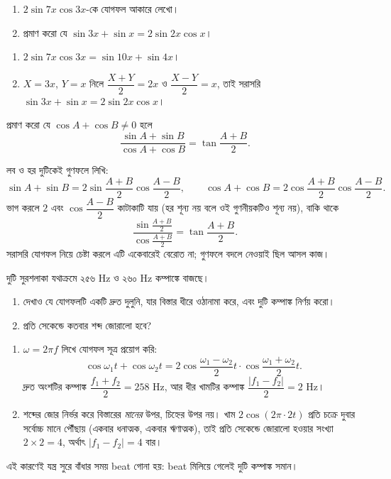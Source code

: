 \documentclass[11pt]{article}
\begin{document}
 \begin{enumerate}
  \item $2\sin 7x\cos 3x$-কে যোগফল আকারে লেখো।
  \item প্রমাণ করো যে $\sin 3x + \sin x = 2\sin 2x\cos x$।
\end{enumerate}

\begin{sol}
\begin{enumerate}
  \item $2\sin 7x\cos 3x = \sin 10x + \sin 4x$।
  \item $X = 3x$, $Y = x$ নিলে $\dfrac{X+Y}{2} = 2x$ ও $\dfrac{X-Y}{2} = x$,
        তাই সরাসরি $\sin 3x + \sin x = 2\sin 2x\cos x$।
\end{enumerate}
\end{sol}

 প্রমাণ করো যে $\cos A + \cos B \neq 0$ হলে
\[
  \frac{\sin A + \sin B}{\cos A + \cos B} = \tan\frac{A+B}{2} .
\]

\begin{sol}
লব ও হর দুটিকেই গুণফলে লিখি:
\[
  \sin A + \sin B = 2\sin\frac{A+B}{2}\cos\frac{A-B}{2}, \qquad
  \cos A + \cos B = 2\cos\frac{A+B}{2}\cos\frac{A-B}{2} .
\]
ভাগ করলে $2$ এবং $\cos\dfrac{A-B}{2}$ কাটাকাটি যায় (হর শূন্য নয় বলে ওই
গুণনীয়কটিও শূন্য নয়), বাকি থাকে
\[
  \frac{\sin\frac{A+B}{2}}{\cos\frac{A+B}{2}} = \tan\frac{A+B}{2} .
\]
সরাসরি যোগফল নিয়ে চেষ্টা করলে এটি একেবারেই বেরোত না; গুণফলে বদলে নেওয়াই ছিল
আসল কাজ।
\end{sol}

 দুটি সুরশলাকা যথাক্রমে ২৫৬ Hz ও ২৬০ Hz কম্পাঙ্কে বাজছে।
\begin{enumerate}
  \item দেখাও যে যোগফলটি একটি দ্রুত দুলুনি, যার বিস্তার ধীরে ওঠানামা করে, এবং
        দুটি কম্পাঙ্ক নির্ণয় করো।
  \item প্রতি সেকেন্ডে কতবার শব্দ জোরালো হবে?
\end{enumerate}

\begin{sol}
\begin{enumerate}
  \item $\omega = 2\pi f$ লিখে যোগফল সূত্র প্রয়োগ করি:
        \[
          \cos\omega_{1}t + \cos\omega_{2}t
          = 2\cos\frac{\omega_{1}-\omega_{2}}{2}t \cdot
            \cos\frac{\omega_{1}+\omega_{2}}{2}t .
        \]
        দ্রুত অংশটির কম্পাঙ্ক $\dfrac{f_{1}+f_{2}}{2} = 258$ Hz, আর ধীর
        খামটির কম্পাঙ্ক $\dfrac{|f_{1}-f_{2}|}{2} = 2$ Hz।
  \item শব্দের জোর নির্ভর করে বিস্তারের \emph{মানের} উপর, চিহ্নের উপর নয়। খাম
        $2\cos(2\pi \cdot 2 t)$ প্রতি চক্রে দুবার সর্বোচ্চ মানে পৌঁছায় (একবার
        ধনাত্মক, একবার ঋণাত্মক), তাই প্রতি সেকেন্ডে জোরালো হওয়ার সংখ্যা
        $2 \times 2 = 4$, অর্থাৎ $|f_{1}-f_{2}| = 4$ বার।
\end{enumerate}
এই কারণেই যন্ত্র সুরে বাঁধার সময় beat গোনা হয়: beat মিলিয়ে গেলেই দুটি
কম্পাঙ্ক সমান।
\end{sol}
\end{document}
